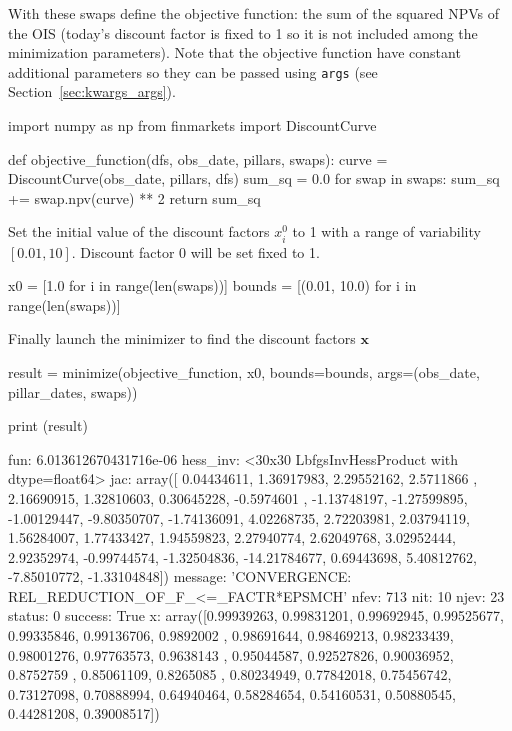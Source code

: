 With these swaps define the objective function: the sum of the squared NPVs of the OIS (today's discount factor is fixed to 1 so it is not included among the minimization parameters). Note that the objective function have constant additional parameters so they can be passed using \texttt{args} (see Section~\ref{sec:kwargs_args}). 

\begin{ipython}
import numpy as np
from finmarkets import DiscountCurve 

def objective_function(dfs, obs_date, pillars, swaps):
    curve = DiscountCurve(obs_date, pillars, dfs)
    sum_sq = 0.0
    for swap in swaps:
        sum_sq += swap.npv(curve) ** 2
    return sum_sq
\end{ipython}

Set the initial value of the discount factors $x_i^0$ to 1 with a range of variability $[0.01, 10]$. Discount factor 0 will be set fixed to 1.

\begin{ipython}
x0 = [1.0 for i in range(len(swaps))]
bounds = [(0.01, 10.0) for i in range(len(swaps))]
\end{ipython}

Finally launch the minimizer to find the discount factors $\mathbf{x}$

\begin{ipython}
result = minimize(objective_function, x0, bounds=bounds,
                  args=(obs_date, pillar_dates, swaps))

print (result)
\end{ipython}
\begin{ioutput}
      fun: 6.013612670431716e-06
 hess_inv: <30x30 LbfgsInvHessProduct with dtype=float64>
      jac: array([  0.04434611,   1.36917983,   2.29552162,   2.5711866 ,
         2.16690915,   1.32810603,   0.30645228,  -0.5974601 ,
        -1.13748197,  -1.27599895,  -1.00129447,  -9.80350707,
        -1.74136091,   4.02268735,   2.72203981,   2.03794119,
         1.56284007,   1.77433427,   1.94559823,   2.27940774,
         2.62049768,   3.02952444,   2.92352974,  -0.99744574,
        -1.32504836, -14.21784677,   0.69443698,   5.40812762,
        -7.85010772,  -1.33104848])
  message: 'CONVERGENCE: REL_REDUCTION_OF_F_<=_FACTR*EPSMCH'
     nfev: 713
      nit: 10
     njev: 23
   status: 0
  success: True
        x: array([0.99939263, 0.99831201, 0.99692945, 0.99525677, 0.99335846,
       0.99136706, 0.9892002 , 0.98691644, 0.98469213, 0.98233439,
       0.98001276, 0.97763573, 0.9638143 , 0.95044587, 0.92527826,
       0.90036952, 0.8752759 , 0.85061109, 0.8265085 , 0.80234949,
       0.77842018, 0.75456742, 0.73127098, 0.70888994, 0.64940464,
       0.58284654, 0.54160531, 0.50880545, 0.44281208, 0.39008517])
\end{ioutput}

